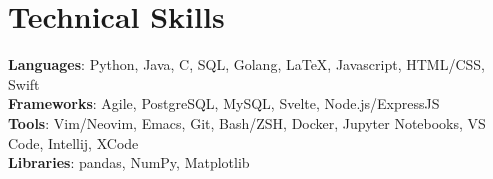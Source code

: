 \documentclass[letterpaper,11pt]{article}
\makeatletter
\newcommand{\resumeItem}[1]{
  \item\small{
    {#1 \vspace{-2pt}}
  }
}
\newcommand{\resumeProjectHeading}[2]{
    \item
    \begin{tabular*}{0.97\textwidth}{l@{\extracolsep{\fill}}r}
      \small#1 & #2 \\
    \end{tabular*}\vspace{-7pt}
}
\newcommand{\resumeSubHeadingListStart}{\begin{itemize}[leftmargin=0.15in, label={}]}
\newcommand{\resumeSubHeadingListEnd}{\end{itemize}}
\newcommand{\resumeItemListStart}{\begin{itemize}}
\newcommand{\resumeItemListEnd}{\end{itemize}\vspace{-5pt}}
\makeatother
\begin{document}



%
\section{Technical Skills}
 \begin{itemize}[leftmargin=0.15in, label={}]
    \small{\item{
     \textbf{Languages}{: Python, Java, C, SQL, Golang, \LaTeX, Javascript, HTML/CSS, Swift} \\
     \textbf{Frameworks}{: Agile, PostgreSQL, MySQL, Svelte, Node.js/ExpressJS} \\
     \textbf{Tools}{: Vim/Neovim, Emacs, Git, Bash/ZSH, Docker, Jupyter Notebooks, VS Code, Intellij, XCode} \\
     \textbf{Libraries}{: pandas, NumPy, Matplotlib}
    }}
 \end{itemize}


\end{document}
